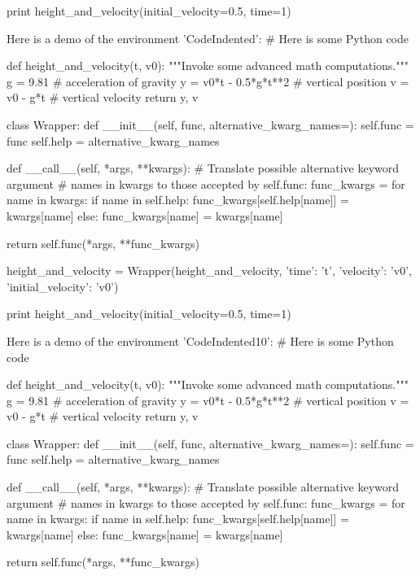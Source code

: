 print height_and_velocity(initial_velocity=0.5, time=1)


\noindent
Here is a demo of the environment 'CodeIndented':
# Here is some Python code

def height_and_velocity(t, v0):
    """Invoke some advanced math computations."""
    g = 9.81                  # acceleration of gravity
    y = v0*t - 0.5*g*t**2     # vertical position
    v = v0 - g*t              # vertical velocity
    return y, v

class Wrapper:
    def __init__(self, func, alternative_kwarg_names={}):
        self.func = func
        self.help = alternative_kwarg_names

    def __call__(self, *args, **kwargs):
        # Translate possible alternative keyword argument
        # names in kwargs to those accepted by self.func:
        func_kwargs = {}
        for name in kwargs:
            if name in self.help:
                func_kwargs[self.help[name]] = kwargs[name]
            else:
                func_kwargs[name] = kwargs[name]

        return self.func(*args, **func_kwargs)

height_and_velocity = Wrapper(height_and_velocity,
                              {'time': 't',
                               'velocity': 'v0',
                               'initial_velocity': 'v0'})

print height_and_velocity(initial_velocity=0.5, time=1)


\noindent
Here is a demo of the environment 'CodeIndented10':
# Here is some Python code

def height_and_velocity(t, v0):
    """Invoke some advanced math computations."""
    g = 9.81                  # acceleration of gravity
    y = v0*t - 0.5*g*t**2     # vertical position
    v = v0 - g*t              # vertical velocity
    return y, v

class Wrapper:
    def __init__(self, func, alternative_kwarg_names={}):
        self.func = func
        self.help = alternative_kwarg_names

    def __call__(self, *args, **kwargs):
        # Translate possible alternative keyword argument
        # names in kwargs to those accepted by self.func:
        func_kwargs = {}
        for name in kwargs:
            if name in self.help:
                func_kwargs[self.help[name]] = kwargs[name]
            else:
                func_kwargs[name] = kwargs[name]

        return self.func(*args, **func_kwargs)

